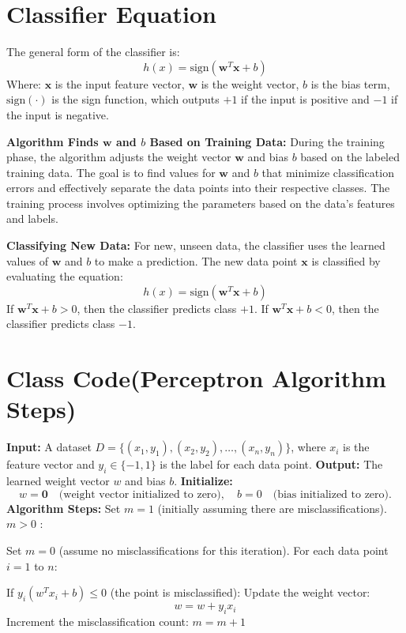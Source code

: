 \section{Classifier Equation}


The general form of the classifier is:
\[
h(x) = \text{sign}(\mathbf{w}^T \mathbf{x} + b)
\]
Where:
\( \mathbf{x} \) is the input feature vector,
\( \mathbf{w} \) is the weight vector,
\( b \) is the bias term,
\( \text{sign}(\cdot) \) is the sign function, which outputs \( +1 \) if the input is positive and \( -1 \) if the input is negative.

\begin{outline}
    \1 \textbf{Algorithm Finds \( \mathbf{w} \) and \( b \) Based on Training Data:} 
    During the training phase, the algorithm adjusts the weight vector \( \mathbf{w} \) and bias \( b \) based on the labeled training data. 
    The goal is to find values for \( \mathbf{w} \) and \( b \) that minimize classification errors and effectively separate the data points into their respective classes. 
    The training process involves optimizing the parameters based on the data's features and labels.

    \1 \textbf{Classifying New Data:} 
    For new, unseen data, the classifier uses the learned values of \( \mathbf{w} \) and \( b \) to make a prediction. 
    The new data point \( \mathbf{x} \) is classified by evaluating the equation:
    \[
    h(x) = \text{sign}(\mathbf{w}^T \mathbf{x} + b)
    \]
        \2 If \( \mathbf{w}^T \mathbf{x} + b > 0 \), then the classifier predicts class \( +1 \).
        \2 If \( \mathbf{w}^T \mathbf{x} + b < 0 \), then the classifier predicts class \( -1 \).
\end{outline}

\section{Class Code(Perceptron Algorithm Steps)}

\begin{outline}
    \1 \textbf{Input:} A dataset \( D = \{(x_1, y_1), (x_2, y_2), \dots, (x_n, y_n)\} \), where \( x_i \) is the feature vector and \( y_i \in \{-1, 1\} \) is the label for each data point.
    \1 \textbf{Output:} The learned weight vector \( w \) and bias \( b \).
    \1 \textbf{Initialize:} 
    \[
    w = \mathbf{0} \quad \text{(weight vector initialized to zero)}, \quad b = 0 \quad \text{(bias initialized to zero)}.
    \]
    \1 \textbf{Algorithm Steps:}
        \2[1.] Set \( m = 1 \) (initially assuming there are misclassifications).
        \2[2.]  \( m > 0 \) :
        
            \3[(a). ] Set \( m = 0 \) (assume no misclassifications for this iteration).
            \3[(b). ] For each data point \( i = 1 \) to \( n \):
            
                \4 If \( y_i (w^T x_i + b) \leq 0 \) (the point is misclassified):
                \4 Update the weight vector: 
                \[
                w = w + y_i x_i
                \]
                \4 Increment the misclassification count: \( m = m + 1 \)
\end{outline}
